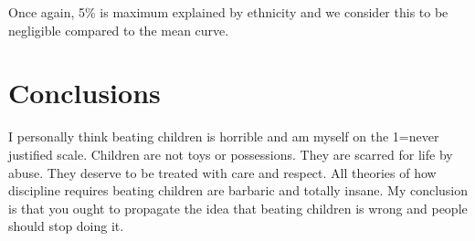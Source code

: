 \documentclass{amsart}
\begin{document}
Once again, 5\% is maximum explained by ethnicity and we consider this to be negligible compared to the mean curve.

\section{Conclusions}

I personally think beating children is horrible and am myself on the 1=never justified scale.  Children are not toys or possessions.  They are scarred for life by abuse.  They deserve to be treated with care and respect.  All theories of how discipline requires beating children are barbaric and totally insane.  My conclusion is that you ought to propagate the idea that beating children is wrong and people should stop doing it.
\end{document}
